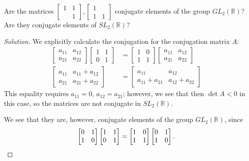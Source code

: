 \documentclass[12pt]{article}
\theoremstyle{remark}
\newcommand{\GL}{\mathit{GL}}
\newcommand{\SL}{\mathit{SL}}
\begin{document}
\setcounter{subsubsection}{5}
\begin{problem}
  Are the matrices $\begin{bmatrix}1&1\\&1\end{bmatrix},\begin{bmatrix}1&\\1&1\end{bmatrix}$ conjugate elements of the group $\GL_2(\mathbb{R})$? Are they conjugate elements of $\SL_2(\mathbb{R})$?
\end{problem}
\begin{proof}[Solution]
  We explicitly calculate the conjugation for the conjugation matrix $A$:
  \begin{align*}
    \begin{bmatrix}
      a_{11} & a_{12}\\
      a_{21} & a_{22}
    \end{bmatrix}
    \begin{bmatrix}
      1 & 1\\
      0 & 1
    \end{bmatrix}
    &=
    \begin{bmatrix}
      1 & 0\\
      1 & 1
    \end{bmatrix}
    \begin{bmatrix}
      a_{11} & a_{12}\\
      a_{21} & a_{22}
    \end{bmatrix}\\
    \begin{bmatrix}
      a_{11} & a_{11}+a_{12}\\
      a_{21} & a_{21}+a_{22}
    \end{bmatrix}
    &=
    \begin{bmatrix}
      a_{11} & a_{12}\\
      a_{11}+a_{21} & a_{12}+a_{22}
    \end{bmatrix}
  \end{align*}
  This equality requires $a_{11} = 0$, $a_{12} = a_{21}$; however, we see that then $\det A < 0$ in this case, so the matrices are not conjugate in $\SL_2(\mathbb{R})$.
  \par We see that they are, however, conjugate elements of the group $\GL_2(\mathbb{R})$, since
  \begin{equation*}
    \begin{bmatrix}
      0 & 1\\
      1 & 0
    \end{bmatrix}
    \begin{bmatrix}
      1 & 1\\
      0 & 1
    \end{bmatrix}
    = \begin{bmatrix}
      1 & 0\\
      1 & 1
    \end{bmatrix}
    \begin{bmatrix}
      0 & 1\\
      1 & 0
    \end{bmatrix}.\qedhere
  \end{equation*}
\end{proof}
\end{document}
